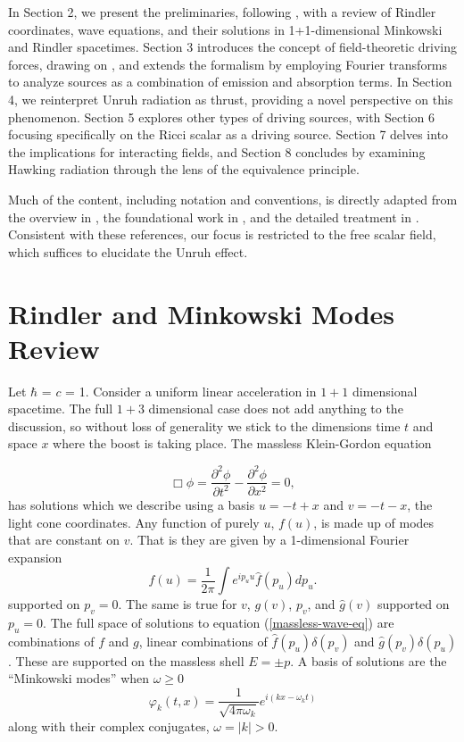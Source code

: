 \documentclass[12pt,a4paper]{article}
\begin{document}
In Section 2, we present the preliminaries, following \cite{Frodden}, with a review of Rindler coordinates, wave equations, and their solutions in 1+1-dimensional Minkowski and Rindler spacetimes. Section 3 introduces the concept of field-theoretic driving forces, drawing on \cite{beisert}, and extends the formalism by employing Fourier transforms to analyze sources as a combination of emission and absorption terms. In Section 4, we reinterpret Unruh radiation as thrust, providing a novel perspective on this phenomenon. Section 5 explores other types of driving sources, with Section 6 focusing specifically on the Ricci scalar as a driving source. Section 7 delves into the implications for interacting fields, and Section 8 concludes by examining Hawking radiation through the lens of the equivalence principle.


Much of the content, including notation and conventions, is directly adapted from the overview in \cite{Frodden}, the foundational work in \cite{unruh}, and the detailed treatment in \cite{beisert}. Consistent with these references, our focus is restricted to the free scalar field, which suffices to elucidate the Unruh effect.

\section{Rindler and Minkowski Modes Review}

Let $\hbar$ = $c$ = 1. Consider a uniform linear acceleration in $1+1$ dimensional spacetime. The full $1+3$ dimensional case does not add anything to the discussion, so without loss of generality we stick to the dimensions time $t$ and space $x$ where the boost is taking place.  The massless Klein-Gordon equation 

\begin{equation}
  \Box \phi = \frac{\partial^2 \phi}{\partial t^2} - \frac{\partial^2 \phi}{\partial x^2} = 0,
 \label{massless-wave-eq}
\end{equation}
has solutions which we describe using a basis  $u = -t + x$ and $v = -t - x$, the light cone coordinates.  Any function of purely $u$, $f(u)$, is made up of modes that are constant on $v$.  That is they are given by a 1-dimensional Fourier expansion
\begin{equation}
  f(u) = \frac{1}{2\pi} \int{e^{i p_u u} \hat{f}(p_u) dp_u}.
\end{equation}
supported on $p_v = 0$.  The same is true for $v$, $g(v)$, $p_v$, and $\hat{g}(v)$ supported on $p_u = 0$.  The full space of solutions to equation (\ref{massless-wave-eq}) are combinations of $f$ and $g$, linear combinations of $\hat{f}(p_u) \delta(p_v)$ and $\hat{g}(p_v) \delta(p_u)$.  These are supported on the massless shell $E = \pm p$.  A basis of solutions are the ``Minkowski modes'' when $\omega \ge 0$
\begin{equation}
  \varphi_k(t,x) = \frac{1}{\sqrt{4 \pi \omega_k}} e^{i(k x - \omega_k t)}
\end{equation}
along with their complex conjugates, $\omega = |k| > 0$.
\end{document}
